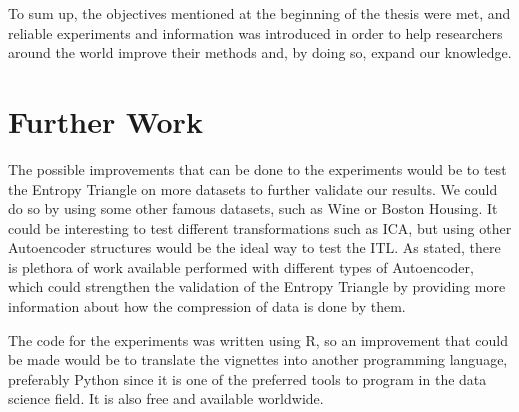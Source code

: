 To sum up, the objectives mentioned at the beginning of the thesis were met, and reliable experiments and information was introduced in order to help researchers around the world improve their methods and, by doing so, expand our knowledge.

\section{Further Work}

The possible improvements that can be done to the experiments would be to test the Entropy Triangle on more datasets to further validate our results. We could do so by using some other famous datasets, such as Wine or Boston Housing. It could be interesting to test different transformations such as ICA, but using other Autoencoder structures would be the ideal way to test the ITL. As stated, there is plethora of work available performed with different types of Autoencoder, which could strengthen the validation of the Entropy Triangle by providing more information about how the compression of data is done by them. \par

The code for the experiments was written using R, so an improvement that could be made would be to translate the vignettes into another programming language, preferably Python since it is one of the preferred tools to program in the data science field. It is also free and available worldwide. \par

